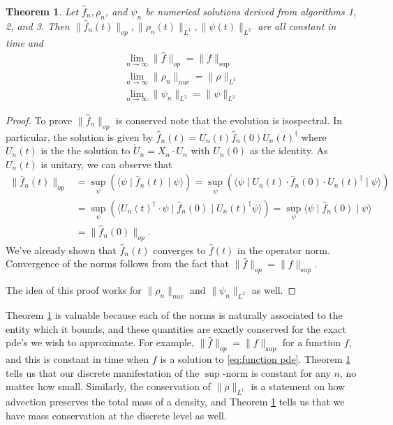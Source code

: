 \documentclass[12pt]{amsart}
\newtheorem{thm}{Theorem}[section]
\begin{document}
\begin{thm} \label{thm:norms}
	Let $\hat{f}_{n}, \rho_{n}$, and $\psi_{n}$ be numerical solutions derived from algorithms 1, 2, and 3.
	Then $\| \hat{f}_{n}(t) \|_{op}, \|\rho_{n}(t)\|_{L^{1}} , \| \psi (t)\|_{L^{2}}$ are all constant in time
	and
	\begin{align}
		\lim_{n \to \infty} \| \hat{f} \|_{op} = \| f \|_{\sup} \\
		\lim_{n \to \infty} \| \rho_{n} \|_{nuc} = \| \rho \|_{L^{1}} \\
		\lim_{n \to \infty} \| \psi_{n} \|_{L^{2}} = \| \psi \|_{L^{2}}
	\end{align}
\end{thm}
\begin{proof}
	To prove $\| \hat{f}_{n} \|_{op}$ is conserved note that the evolution is isospectral.
	In particular, the solution is given by $\hat{f}_{n}(t) = U_{n}(t) \hat{f}_{n}(0) U_{n}(t)^{\dagger}$
	where $U_{n}(t)$ is the the solution to $\dot{U}_{n} = X_{n} \cdot U_{n}$ with $U_{n}(0)$ as the identity.
	As $U_{n}(t)$ is unitary, we can observe that 
	\begin{align}
		\| \hat{f}_{n}(t) \|_{op}  &= \sup_{\psi}( \langle \psi \mid \hat{f}_{n}(t) \mid \psi \rangle) = \sup_{\psi}\left( \langle \psi \mid U_{n}(t) \cdot \hat{f}_{n}(0) \cdot U_{n}(t)^{\dagger} \mid \psi \rangle \right) \\
			&= \sup_{\psi} \left( \langle U_{n}(t)^{\dagger} \cdot \psi \mid \hat{f}_{n}(0) \mid U_{n}(t)^{\dagger} \psi \rangle \right) = \sup_{\psi} \langle \psi \mid \hat{f}_{n}(0) \mid \psi \rangle \\
			&= \| \hat{f}_{n}(0) \|_{op}.
	\end{align}
	We've already shown that $\hat{f}_{n}(t)$ converges to $\hat{f}(t)$ in the operator norm.
	Convergence of the norms follows from the fact that $\| \hat{f} \|_{op} = \| f \|_{\sup}$.
	
	The idea of this proof works for $\| \rho_{n} \|_{nuc}$ and $\| \psi_{n} \|_{L^{2}}$ as well.
\end{proof}

Theorem \ref{thm:norms} is valuable because each of the norms is naturally associated to the entity which it bounds, and these quantities are exactly conserved for the exact pde's we wish to approximate.
For example, $\| \hat{f} \|_{op} = \| f \|_{\sup}$ for a function $f$, and this is constant in time when $f$ is a solution to \eqref{eq:function pde}.
Theorem \ref{thm:norms} tells us that our discrete manifestation of the $\sup$-norm is constant for any $n$, no matter how small.
Similarly, the conservation of $\| \rho \|_{L^{1}}$ is a statement on how advection preserves the total mass of a density, and Theorem \ref{thm:norms} tells us that we have mass conservation at the discrete level as well.
\end{document}
